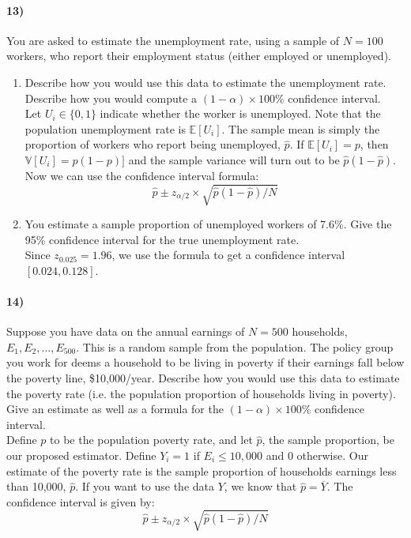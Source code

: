 \documentclass[12pt]{article}
\newcommand\ov{\overline}
\newcommand\BB{\mathbb}
\newcommand\EE{\mathbb{E}}
\newcommand\h{\hat}
\numberwithin{equation}{section}
\numberwithin{figure}{section}
\numberwithin{table}{section}
\begin{document}
\paragraph{13)} You are asked to estimate the unemployment rate, using a sample of $N=100$ workers, who report their employment status (either employed or unemployed).
\begin{enumerate}
\item Describe how you would use this data to estimate the unemployment rate. Describe how you would compute a $(1-\alpha)\times100\%$ confidence interval. \\
  {\color{blue} Let $U_i\in\{0,1\}$ indicate whether the worker is unemployed. Note that the population unemployment rate is $\EE[U_i]$. The sample mean is simply the proportion of workers who report being unemployed, $\h{p}$. If $\EE[U_i]=p$, then $\BB{V}[U_i]=p(1-p)]$ and the sample variance will turn out to be $\h{p}(1-\h{p})$.
Now we can use the confidence interval formula:
\[\h{p} \pm z_{\alpha/2} \times \sqrt{\h{p}(1-\h{p})/N}\]}
\item You estimate a sample proportion of unemployed workers of 7.6\%. Give the 95\% confidence interval for the true unemployment rate. \\
{\color{blue} Since $z_{0.025} = 1.96$, we use the formula to get a confidence interval $[0.024,0.128]$.}
\end{enumerate}

\paragraph{14)} Suppose you have data on the annual earnings of $N=500$ households, $E_1,E_2,...,E_{500}$. This is a random sample from the population. The policy group you work for deems a household to be living in poverty if their earnings fall below the poverty line, \$10,000/year. Describe how you would use this data to estimate the poverty rate (i.e. the population proportion of households living in poverty). Give an estimate as well as a formula for the $(1-\alpha)\times100\%$ confidence interval. \\
{\color{blue} Define $p$ to be the population poverty rate, and let $\h{p}$, the sample proportion, be our proposed estimator. Define $Y_i = 1$ if $E_i\leq10,000$ and 0 otherwise. Our estimate of the poverty rate is the sample proportion of households earnings less than 10,000, $\h{p}$. If you want to use the data $Y$, we know that $\h{p}=\ov{Y}$. The confidence interval is given by:
\[\h{p} \pm z_{\alpha/2} \times \sqrt{\h{p}(1-\h{p})/N}\]}
\end{document}
